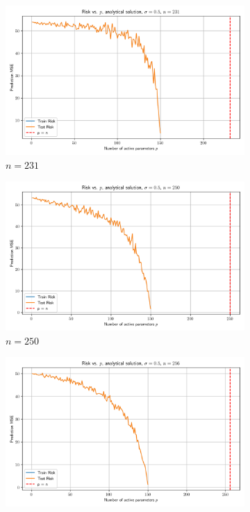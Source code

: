 \documentclass[twoside,10pt]{article}
\begin{document}
\begin{figure}[htb]
  \begin{subfigure}[b]{\imgwidth}
    \includegraphics[width=\linewidth]{img2/risk_curve_n231.png}
    \caption{$n=231$}\label{fig:2m}
  \end{subfigure}%
  \hfill
  \begin{subfigure}[b]{\imgwidth}
    \includegraphics[width=\linewidth]{img2/risk_curve_n250.png}
    \caption{$n=250$}\label{fig:2n}
  \end{subfigure}%
  \hfill
  \begin{subfigure}[b]{\imgwidth}
    \includegraphics[width=\linewidth]{img2/risk_curve_n256.png}

\end{subfigure}
\end{figure}
\end{document}
